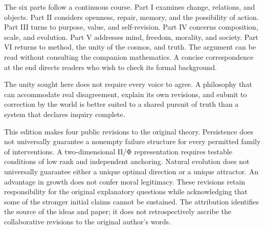 \documentclass[
  english,
  11pt,
  oneside]{book}
\newcounter{none} %
\begin{document}
The six parts follow a continuous course. Part I examines change, relations, and objects. Part II considers openness, repair, memory, and the possibility of action. Part III turns to purpose, value, and self-revision. Part IV concerns composition, scale, and evolution. Part V addresses mind, freedom, morality, and society. Part VI returns to method, the unity of the cosmos, and truth. The argument can be read without consulting the companion mathematics. A concise correspondence at the end directs readers who wish to check its formal background.

The unity sought here does not require every voice to agree. A philosophy that can accommodate real disagreement, explain its own revisions, and submit to correction by the world is better suited to a shared pursuit of truth than a system that declares inquiry complete.

This edition makes four public revisions to the original theory. Persistence does not universally guarantee a nonempty failure structure for every permitted family of interventions. A two-dimensional Π/Φ representation requires testable conditions of low rank and independent anchoring. Natural evolution does not universally guarantee either a unique optimal direction or a unique attractor. An advantage in growth does not confer moral legitimacy. These revisions retain responsibility for the original explanatory questions while acknowledging that some of the stronger initial claims cannot be sustained. The attribution identifies the source of the ideas and paper; it does not retrospectively ascribe the collaborative revisions to the original author's words.
\end{document}
